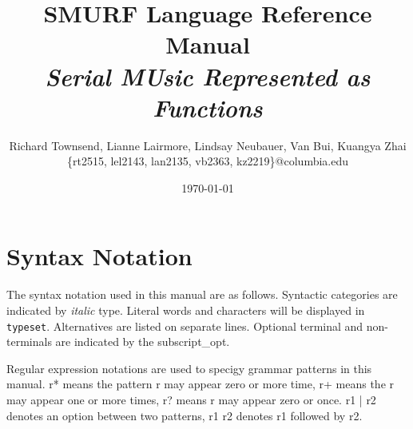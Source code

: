 \documentclass[dvips, 12pt]{article}
\title{{\Huge \bfseries SMURF Language Reference Manual} \\ \Large \it Serial MUsic Represented as Functions \vspace{0.6cm}}
\author{\normalsize Richard Townsend, Lianne Lairmore, Lindsay Neubauer, Van Bui, Kuangya Zhai
	\\ \small \{rt2515, lel2143, lan2135, vb2363, kz2219\}@columbia.edu \vspace{0.6cm}}
\date{\today \vspace{2cm}}
\begin{document}
\maketitle
\clearpage


\tableofcontents

\section{Syntax Notation}
The syntax notation used in this manual are as follows. Syntactic 
categories are indicated by \emph{italic} type. Literal words and 
characters will be displayed in \texttt{typeset}. Alternatives are listed 
on separate lines. Optional terminal and non-terminals are indicated by the
subscript\_{opt}. 

Regular expression notations are used to specigy grammar patterns in this manual.
r* means the pattern r may appear zero or more time, r+ means the r may appear one or more 
times, r? means r may appear zero or once. r1 | r2 denotes an option between two patterns, r1 r2 denotes 
r1 followed by r2. 








\clearpage



\end{document}

